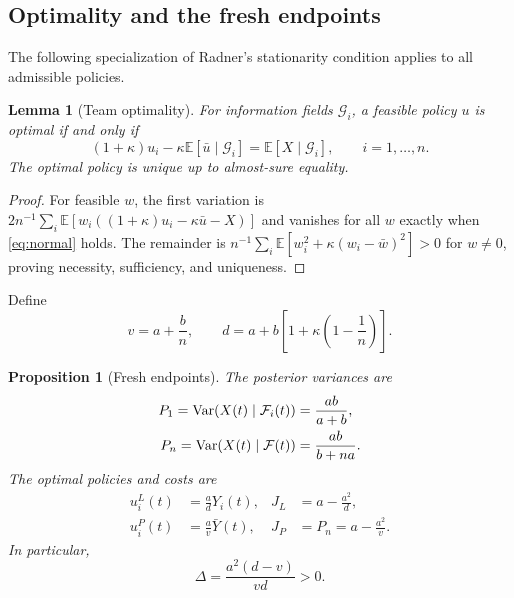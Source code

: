 \documentclass[letterpaper,10pt,conference]{ieeeconf}
\newtheorem{lemma}{Lemma}
\newtheorem{proposition}{Proposition}
\newcommand{\E}{\mathbb E}
\newcommand{\Var}{\operatorname{Var}}
\begin{document}
\subsection{Optimality and the fresh endpoints}
The following specialization of Radner's stationarity condition \cite{radner1962team} applies to all admissible policies.
\begin{lemma}[Team optimality]\label{lem:normal}
For information fields $\mathcal G_i$, a feasible policy $u$ is optimal if and only if
\begin{equation}
 (1+\kappa)u_i-\kappa\E[\bar u\mid\mathcal G_i]
       =\E[X\mid\mathcal G_i],\qquad i=1,\ldots,n.\label{eq:normal}
\end{equation}
The optimal policy is unique up to almost-sure equality.
\end{lemma}
\begin{proof}
For feasible $w$, the first variation is $2n^{-1}\sum_i\E[w_i((1+\kappa)u_i-\kappa\bar u-X)]$ and vanishes for all $w$ exactly when \eqref{eq:normal} holds. The remainder is $n^{-1}\sum_i\E[w_i^2+\kappa(w_i-\bar w)^2]>0$ for $w\ne0$, proving necessity, sufficiency, and uniqueness.
\end{proof}
Define
\begin{equation}
 v=a+\frac bn,\qquad d=a+b\left[1+\kappa\left(1-\frac1n\right)\right].\label{eq:vd}
\end{equation}
\begin{proposition}[Fresh endpoints]\label{prop:endpoints}
The posterior variances are
\begin{align}
 P_1=\Var(X(t)\mid\mathcal F_i(t))&=\frac{ab}{a+b},\notag\\
 P_n=\Var(X(t)\mid\mathcal F(t))&=\frac{ab}{b+na}.\label{eq:posterior}
\end{align}
The optimal policies and costs are
\begin{align}
 u_i^L(t)&=\frac ad Y_i(t),& J_L&=a-\frac{a^2}{d},\label{eq:local}\\
 u_i^P(t)&=\frac av\bar Y(t),& J_P&=P_n=a-\frac{a^2}{v}.\label{eq:pooled}
\end{align}
In particular,
\begin{equation}
 \Delta=\frac{a^2(d-v)}{vd}>0.\label{eq:delta}
\end{equation}
\end{proposition}
\end{document}
